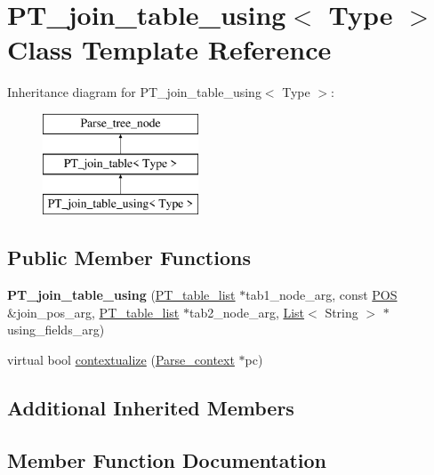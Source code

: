 \hypertarget{classPT__join__table__using}{}\section{P\+T\+\_\+join\+\_\+table\+\_\+using$<$ Type $>$ Class Template Reference}
\label{classPT__join__table__using}
Inheritance diagram for P\+T\+\_\+join\+\_\+table\+\_\+using$<$ Type $>$\+:\begin{figure}[H]
\begin{center}
\leavevmode
\includegraphics[height=3.000000cm]{classPT__join__table__using}
\end{center}
\end{figure}
\subsection*{Public Member Functions}
\begin{DoxyCompactItemize}
\item 
\mbox{\label{classPT__join__table__using_a3dc3ca65cb71a53752f2217caeb881d1}} 
{\bfseries P\+T\+\_\+join\+\_\+table\+\_\+using} (\mbox{\hyperlink{classPT__table__list}{P\+T\+\_\+table\+\_\+list}} $\ast$tab1\+\_\+node\+\_\+arg, const \mbox{\hyperlink{structYYLTYPE}{P\+OS}} \&join\+\_\+pos\+\_\+arg, \mbox{\hyperlink{classPT__table__list}{P\+T\+\_\+table\+\_\+list}} $\ast$tab2\+\_\+node\+\_\+arg, \mbox{\hyperlink{classList}{List}}$<$ String $>$ $\ast$using\+\_\+fields\+\_\+arg)
\item 
virtual bool \mbox{\hyperlink{classPT__join__table__using_a08c0a676d559eff0da223764a8f127f2}{contextualize}} (\mbox{\hyperlink{structParse__context}{Parse\+\_\+context}} $\ast$pc)
\end{DoxyCompactItemize}
\subsection*{Additional Inherited Members}


\subsection{Member Function Documentation}
\mbox{\label{classPT__join__table__using_a08c0a676d559eff0da223764a8f127f2}} 
